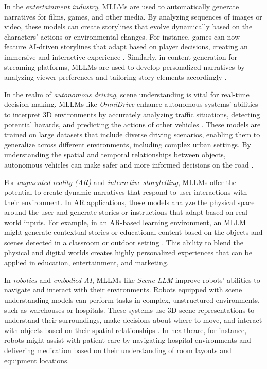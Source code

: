 In the \textit{entertainment industry}, MLLMs are used to automatically generate narratives for films, games, and other media. By analyzing sequences of images or video, these models can create storylines that evolve dynamically based on the characters' actions or environmental changes. For instance, games can now feature AI-driven storylines that adapt based on player decisions, creating an immersive and interactive experience \cite{vs2020parde}. Similarly, in content generation for streaming platforms, MLLMs are used to develop personalized narratives by analyzing viewer preferences and tailoring story elements accordingly \cite{vs2024song}.

In the realm of \textit{autonomous driving}, scene understanding is vital for real-time decision-making. MLLMs like \textit{OmniDrive} enhance autonomous systems' abilities to interpret 3D environments by accurately analyzing traffic situations, detecting potential hazards, and predicting the actions of other vehicles \cite{vs2024alvarez}. These models are trained on large datasets that include diverse driving scenarios, enabling them to generalize across different environments, including complex urban settings. By understanding the spatial and temporal relationships between objects, autonomous vehicles can make safer and more informed decisions on the road \cite{vs2024rao}.

For \textit{augmented reality (AR)} and \textit{interactive storytelling}, MLLMs offer the potential to create dynamic narratives that respond to user interactions with their environment. In AR applications, these models analyze the physical space around the user and generate stories or instructions that adapt based on real-world inputs. For example, in an AR-based learning environment, an MLLM might generate contextual stories or educational content based on the objects and scenes detected in a classroom or outdoor setting \cite{vs2019dey}. This ability to blend the physical and digital worlds creates highly personalized experiences that can be applied in education, entertainment, and marketing.

In \textit{robotics} and \textit{embodied AI}, MLLMs like \textit{Scene-LLM} improve robots' abilities to navigate and interact with their environments. Robots equipped with scene understanding models can perform tasks in complex, unstructured environments, such as warehouses or hospitals. These systems use 3D scene representations to understand their surroundings, make decisions about where to move, and interact with objects based on their spatial relationships \cite{vs2024rao1}. In healthcare, for instance, robots might assist with patient care by navigating hospital environments and delivering medication based on their understanding of room layouts and equipment locations.

